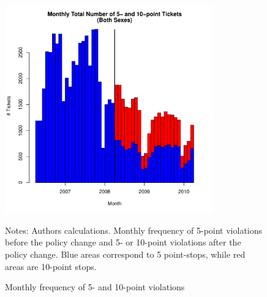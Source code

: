 
\pagebreak






\begin{figure}
\centering
\includegraphics[width=0.8\textwidth]{../Figures/num_pts_5_10_all_orig.pdf}
\caption{Monthly frequency of 5- and 10-point violations }
Notes: Authors calculations. Monthly frequency of 5-point violations before the policy change and 5- or 10-point violations after the policy change. Blue areas correspond to 5 point-stops, while red areas are 10-point stops.
\label{fig:num_pts_5_10_all}
\end{figure}


